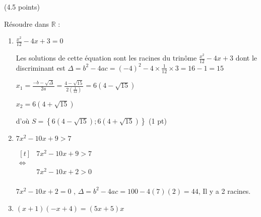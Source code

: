\documentclass[a4paper,11pt]{article}
\theoremstyle{break}
\begin{document}
  \begin{exo}(4.5 points)
  
   Résoudre dans $\mathbb{R}$ :
   \begin{enumerate}
   
       \item $\frac{x^2}{12}-4 x+3=0$
    
\begin{correction}
 
 Les solutions de cette \'equation sont les racines du trin\^ome $\frac{x^2}{12}-4 x+3$
 dont le discriminant est $\Delta=b^2-4ac=(-4)^2-4 \times \frac{1}{12}\times 3=16-1=15$
    
    $x_1=\frac{-b-\sqrt{\Delta}}{2a}=\frac{4-\sqrt{15}}{2(\frac{1}{12})}=6(4-\sqrt{15})$
    
    $x_2=6(4+\sqrt{15})$
    
    d'o\`u $S=\left \{ 6(4-\sqrt{15});6(4+\sqrt{15})\right \}$ (1 pt)
 
\end{correction}
 
    \item $7 x^2-10 x+9>7$

\begin{correction}

$\begin{aligned}[t]
           & 7x^2-10x+9>7 \\
      \iff \\
           & 7x^2-10x+2>0\\
 \end{aligned}$          
 
 $7x^2-10x+2=0$ , $\Delta=b^2-4ac=100-4(7)(2)=44$, Il y a 2 racines.
 
%  
%     
    
 
\end{correction} 
 
    \item $(x+1)(-x+4)=(5x+5)x$
    

\end{enumerate}
\end{exo}
\end{document}
